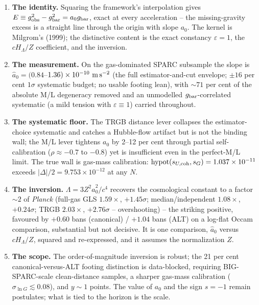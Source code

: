 \documentclass[fleqn,usenatbib]{mnras}
\begin{document}
\begin{enumerate}
\item \textbf{The identity.} Squaring the framework's interpolation gives $E\equiv g_{\rm obs}^2-g_{\rm bar}^2=a_0 g_{\rm bar}$, exact at every acceleration -- the missing-gravity excess is a straight line through the origin with slope $a_0$. The kernel is Milgrom's (1999); the distinctive content is the exact constancy $\varepsilon=1$, the $cH_\Lambda/Z$ coefficient, and the inversion.
\item \textbf{The measurement.} On the gas-dominated SPARC subsample the slope is $\hat a_0=(0.84$--$1.36)\times10^{-10}\ {\rm m\,s^{-2}}$ (the full estimator-and-cut envelope; $\pm16$ per cent $1\sigma$ systematic budget; no usable footing lean), with ${\sim}71$ per cent of the absolute M/L degeneracy removed and an unmodelled $g_{\rm bar}$-correlated systematic (a mild tension with $\varepsilon\equiv1$) carried throughout.
\item \textbf{The systematic floor.} The TRGB distance lever collapses the estimator-choice systematic and catches a Hubble-flow artifact but is not the binding wall; the M/L lever tightens $a_0$ by 2--12 per cent through partial self-calibration ($\rho\approx-0.7$ to $-0.8$) yet is insufficient even in the perfect-M/L limit. The true wall is gas-mass calibration: $\mathrm{hypot}(s_{U,\rm coh},s_G)=1.037\times10^{-11}$ exceeds $|\Delta|/2=9.753\times10^{-12}$ at any $N$.
\item \textbf{The inversion.} $\Lambda=3Z^2\hat a_0^2/c^4$ recovers the cosmological constant to a factor ${\sim}2$ of \textit{Planck} (full-gas GLS $1.59\times$, $+1.45\sigma$; median/independent $1.08\times$, $+0.24\sigma$; TRGB $2.03\times$, $+2.76\sigma$ -- overshooting) -- the striking positive, favoured by $+0.60$ bans (canonical) / $+1.04$ bans (ALT) on a log-flat Occam comparison, substantial but not decisive. It is one comparison, $\hat a_0$ versus $cH_\Lambda/Z$, squared and re-expressed, and it assumes the normalization $Z$.
\item \textbf{The scope.} The order-of-magnitude inversion is robust; the 21 per cent canonical-versus-ALT footing distinction is data-blocked, requiring BIG-SPARC-scale clean-distance samples, a sharper gas-mass calibration ($\sigma_{\ln G}\lesssim0.08$), and $y\sim1$ points. The value of $a_0$ and the sign $s=-1$ remain postulates; what is tied to the horizon is the scale.
\end{enumerate}

\end{document}
